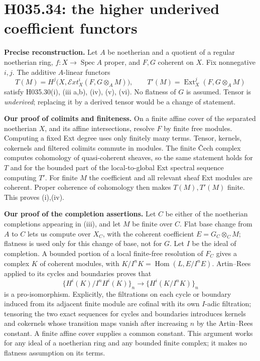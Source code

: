 \section{H035.34: the higher underived coefficient functors}
\textbf{Precise reconstruction.} Let $A$ be noetherian and a quotient
of a regular noetherian ring, $f:X\to\operatorname{Spec}A$ proper,
and $F,G$ coherent on $X$. Fix nonnegative $i,j$. The additive
$A$-linear functors
\[
 T(M)=H^j\bigl(X,\mathcal Ext_X^i(F,G\otimes_A M)\bigr),
 \qquad T'(M)=\operatorname{Ext}_X^j(F,G\otimes_A M)
\]
satisfy H035.30(i), (iii a,b), (iv), (v), (vi). No flatness of $G$
is assumed. Tensor is \emph{underived}; replacing it by a derived
tensor would be a change of statement.

\textbf{Our proof of colimits and finiteness.} On a finite affine
cover of the separated noetherian $X$, and its affine intersections,
resolve $F$ by finite free modules. Computing a fixed Ext degree
uses only finitely many terms. Tensor, kernels, cokernels and filtered
colimits commute in modules. The finite Čech complex computes
cohomology of quasi-coherent sheaves, so the same statement holds
for $T$ and for the bounded part of the local-to-global Ext
spectral sequence computing $T'$. For finite $M$ the coefficient
and all relevant sheaf Ext modules are coherent. Proper coherence
of cohomology then makes $T(M),T'(M)$ finite. This proves (i),(iv).

\textbf{Our proof of the completion assertions.} Let $C$ be either
of the noetherian completions appearing in (iii), and let $M$ be
finite over $C$. Flat base change from $A$ to $C$ lets us compute
over $X_C$, with the coherent coefficient $E=G_C\otimes_C M$;
flatness is used only for this change of base, not for $G$.
Let $I$ be the ideal of completion. A bounded portion of a local
finite-free resolution of $F_C$ gives a complex $K$ of coherent
modules, with
$K/I^nK=\operatorname{Hom}(L,E/I^nE)$.
Artin--Rees applied to its cycles and boundaries proves that
\[
 \{H^i(K)/I^nH^i(K)\}_n\longrightarrow
 \{H^i(K/I^nK)\}_n
\]
is a pro-isomorphism. Explicitly, the filtrations on each cycle or
boundary induced from its adjacent finite module are cofinal with
its own $I$-adic filtration; tensoring the two exact sequences
for cycles and boundaries introduces kernels and cokernels whose
transition maps vanish after increasing $n$ by the Artin--Rees
constant. A finite affine cover supplies a common constant. This
argument works for any ideal of a noetherian ring and any bounded
finite complex; it makes no flatness assumption on its terms.

